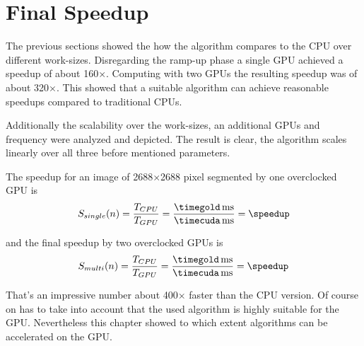 

\section{Final Speedup} %
\label{sec:final_speedup}
The previous sections showed the how the algorithm compares to the \gls{CPU} over
different work-sizes. Disregarding the ramp-up phase a single \gls{GPU} achieved
a speedup of about 160$\times$. Computing with two \glspl{GPU} the resulting 
speedup was of about 320$\times$. This showed that a suitable algorithm can 
achieve reasonable speedups compared to traditional \glspl{CPU}.

Additionally the scalability over the work-sizes, an additional \glspl{GPU} and
frequency were analyzed and depicted. The result is clear, the algorithm scales
linearly over all three before mentioned parameters. 

\fpDiv{\speedup}{\timegold}{\timecuda}

The speedup for an image of 2688$\times$2688 pixel segmented by one
overclocked \gls{GPU} is 
\begin{equation}\label{eq:final_speedup_single}
 S_{single}(n) = \frac{T_{CPU}}{T_{GPU}} = \frac{\unit[\timegold]{ms}}{\unit[\timecuda]{ms}} = \speedup
\end{equation}

\fpDiv{\speedup}{\timegold}{\timecuda}

and the final speedup by two overclocked \glspl{GPU} is
\begin{equation}\label{eq:final_speedup_multi}
 S_{multi}(n) = \frac{T_{CPU}}{T_{GPU}} = \frac{\unit[\timegold]{ms}}{\unit[\timecuda]{ms}} = \speedup
\end{equation}

That's an impressive number about 400$\times$ faster than the \gls{CPU} version. 
Of course on has to take into account that the used algorithm is highly suitable
for the \gls{GPU}. Nevertheless this chapter showed to which extent algorithms 
can be accelerated on the \gls{GPU}.



